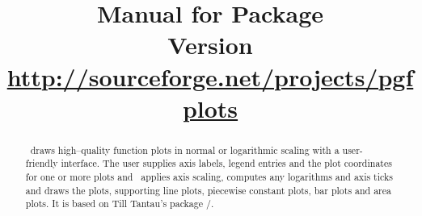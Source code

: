 %
%
%
% 
% 
%
%


\def\plotcoords{%
\addplot coordinates {
(5,8.312e-02)    (17,2.547e-02)   (49,7.407e-03)
(129,2.102e-03)  (321,5.874e-04)  (769,1.623e-04)
(1793,4.442e-05) (4097,1.207e-05) (9217,3.261e-06)
};

\addplot coordinates{
(7,8.472e-02)    (31,3.044e-02)    (111,1.022e-02)
(351,3.303e-03)  (1023,1.039e-03)  (2815,3.196e-04)
(7423,9.658e-05) (18943,2.873e-05) (47103,8.437e-06)
};

\addplot coordinates{
(9,7.881e-02)     (49,3.243e-02)    (209,1.232e-02)
(769,4.454e-03)   (2561,1.551e-03)  (7937,5.236e-04)
(23297,1.723e-04) (65537,5.545e-05) (178177,1.751e-05)
};

\addplot coordinates{
(11,6.887e-02)    (71,3.177e-02)     (351,1.341e-02)
(1471,5.334e-03)  (5503,2.027e-03)   (18943,7.415e-04)
(61183,2.628e-04) (187903,9.063e-05) (553983,3.053e-05)
};

\addplot coordinates{
(13,5.755e-02)     (97,2.925e-02)     (545,1.351e-02)
(2561,5.842e-03)   (10625,2.397e-03)  (40193,9.414e-04)
(141569,3.564e-04) (471041,1.308e-04) 
(1496065,4.670e-05)
};
}%

\title{%
	Manual for Package \PGFPlots\\
	{\small Version \pgfplotsversion}\\
	{\small\href{http://sourceforge.net/projects/pgfplots}{http://sourceforge.net/projects/pgfplots}}}


\maketitle
\begin{abstract}%
\PGFPlots\ draws high--quality function plots in normal or logarithmic scaling with a user-friendly interface. The user supplies axis labels, legend entries and the plot coordinates for one or more plots and \PGFPlots\ applies axis scaling, computes any logarithms and axis ticks and draws the plots, supporting line plots, piecewise constant plots, bar plots and area plots. It is based on Till Tantau's package \PGF/\Tikz.
\end{abstract}
\tableofcontents
